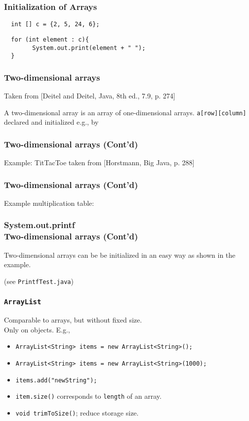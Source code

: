 \documentclass{beamer}
\begin{document}
\begin{frame}
\frametitle{Initialization of Arrays}

\texttt{\ \ int [] c = \{2, 5, 24, 6\};}\\\bigskip
  
\texttt{\ \ for (int element : c)\{}\\
\texttt{\ \ \ \ \ \ \ \ System.out.print(element + " ");}\\
\texttt{\ \ \}}\\
\end{frame}

\begin{frame}
\frametitle{Two-dimensional arrays}
Taken from [Deitel and Deitel, Java, 8th ed., 7.9, p. 274]

A two-dimensional array is an array of one-dimensional arrays.
\texttt{a[row][column]} declared and initialized e.g., by



\end{frame}

\begin{frame}
\frametitle{Two-dimensional arrays (Cont'd)}
Example: TitTacToe taken from [Horstmann, Big Java, p. 288]



\end{frame}


\begin{frame}
\frametitle{Two-dimensional arrays (Cont'd)}
Example multiplication table:

\end{frame}

\begin{frame}
\frametitle{System.out.printf\\
Two-dimensional arrays (Cont'd)}
Two-dimensional arrays can be be initialized in an easy way
as shown in the example.

(see \texttt{PrintfTest.java})
\end{frame}
\begin{frame}
\frametitle{\texttt{ArrayList}}

Comparable to arrays, but without fixed size.\\
Only on objects. E.g.,

\def\baselinestretch{0.5}\def\arraystretch{0.5}
\begin{itemize}\def\arraystretch{0.5}
\item \texttt{ArrayList<String> items = new ArrayList<String>();}
\item \texttt{ArrayList<String> items = new ArrayList<String>(1000);}
\item \texttt{items.add("newString");}
\item \texttt{item.size()} corresponds to \texttt{length} of an array.
\item \texttt{void trimToSize()}; reduce storage size.
\end{itemize}
\end{frame}
\end{document}
